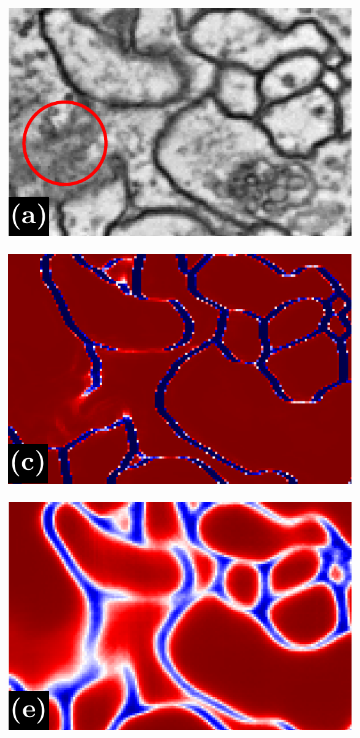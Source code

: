 \begin{figure}[t]
\begin{subfigure}[t]{0.32\linewidth}
\centering
\includegraphics[width=1.0\linewidth,trim=0in 0in 0in 0.2in,clip]{./figs/aff_compare_designer/raw.pdf} %
\end{subfigure}\hfill
\begin{subfigure}[t]{0.32\textwidth}
\centering
\includegraphics[width=1.0\linewidth,trim=0in 0in 0in 0.2in,clip]{./figs/aff_compare_designer/dice_2.pdf} %
\end{subfigure}\hfill
\begin{subfigure}[t]{0.32\linewidth}
\centering
\includegraphics[width=1.0\linewidth,trim=0in 0in 0in 0.2in,clip]{./figs/aff_compare_designer/mask_2.pdf} %

\end{subfigure}
\end{figure}
